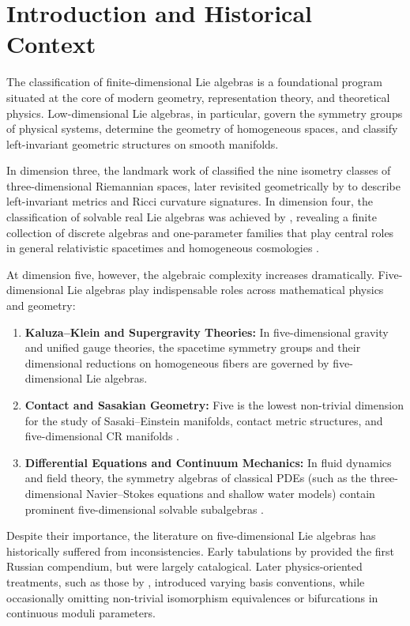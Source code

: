 \documentclass[11pt,a4paper]{article}
\theoremstyle{definition}
\theoremstyle{remark}
\begin{document}
\tableofcontents

\section{Introduction and Historical Context}\label{sec:intro}

The classification of finite-dimensional Lie algebras is a foundational program situated at the core of modern geometry, representation theory, and theoretical physics. Low-dimensional Lie algebras, in particular, govern the symmetry groups of physical systems, determine the geometry of homogeneous spaces, and classify left-invariant geometric structures on smooth manifolds. 

In dimension three, the landmark work of \citet{Bianchi1898} classified the nine isometry classes of three-dimensional Riemannian spaces, later revisited geometrically by \citet{Milnor1976} to describe left-invariant metrics and Ricci curvature signatures. In dimension four, the classification of solvable real Lie algebras was achieved by \citet{Mubarakzyanov1963}, revealing a finite collection of discrete algebras and one-parameter families that play central roles in general relativistic spacetimes and homogeneous cosmologies \citep{PateraSharpWinternitzZassenhaus1976}.

At dimension five, however, the algebraic complexity increases dramatically. Five-dimensional Lie algebras play indispensable roles across mathematical physics and geometry:
\begin{enumerate}
    \item \textbf{Kaluza--Klein and Supergravity Theories:} In five-dimensional gravity and unified gauge theories, the spacetime symmetry groups and their dimensional reductions on homogeneous fibers are governed by five-dimensional Lie algebras.
    \item \textbf{Contact and Sasakian Geometry:} Five is the lowest non-trivial dimension for the study of Sasaki--Einstein manifolds, contact metric structures, and five-dimensional CR manifolds \citep{KnappLieGroups}.
    \item \textbf{Differential Equations and Continuum Mechanics:} In fluid dynamics and field theory, the symmetry algebras of classical PDEs (such as the three-dimensional Navier--Stokes equations and shallow water models) contain prominent five-dimensional solvable subalgebras \citep{SnoblWinternitz}.
\end{enumerate}

Despite their importance, the literature on five-dimensional Lie algebras has historically suffered from inconsistencies. Early tabulations by \citet{Mubarakzyanov1966} provided the first Russian compendium, but were largely catalogical. Later physics-oriented treatments, such as those by \citet{Turkowski1988}, introduced varying basis conventions, while occasionally omitting non-trivial isomorphism equivalences or bifurcations in continuous moduli parameters. 
\end{document}
